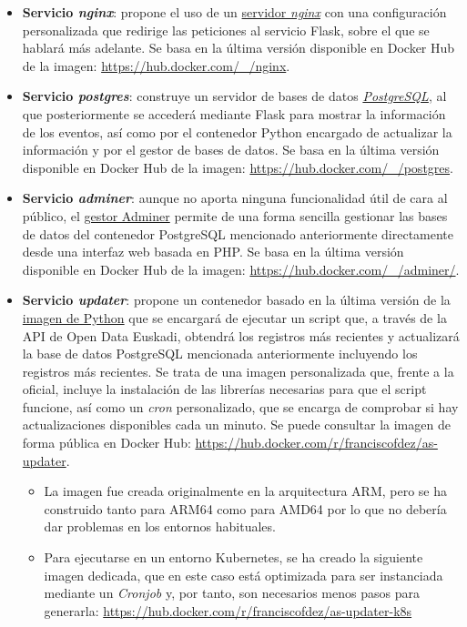 \documentclass{report}
\begin{document}
        \begin{itemize}
            \item \textbf{Servicio \textit{nginx}}: propone el uso de un \href{https://nginx.org/en/}{servidor \textit{nginx}} con una configuración personalizada que redirige las peticiones al servicio Flask, sobre el que se hablará más adelante. Se basa en la última versión disponible en Docker Hub de la imagen: \url{https://hub.docker.com/_/nginx}.
            \item \textbf{Servicio \textit{postgres}}: construye un servidor de bases de datos \textit{\href{https://www.postgresql.org}{PostgreSQL}}, al que posteriormente se accederá mediante Flask para mostrar la información de los eventos, así como por el contenedor Python encargado de actualizar la información y por el gestor de bases de datos. Se basa en la última versión disponible en Docker Hub de la imagen: \url{https://hub.docker.com/_/postgres}.
            \item \textbf{Servicio \textit{adminer}}: aunque no aporta ninguna funcionalidad útil de cara al público, el \href{https://www.adminer.org}{gestor Adminer} permite de una forma sencilla gestionar las bases de datos del contenedor PostgreSQL mencionado anteriormente directamente desde una interfaz web basada en PHP. Se basa en la última versión disponible en Docker Hub de la imagen: \url{https://hub.docker.com/_/adminer/}.
            \item \textbf{Servicio \textit{updater}}: propone un contenedor basado en la última versión de la \href{https://hub.docker.com/_/python}{imagen de Python} que se encargará de ejecutar un script que, a través de la API de Open Data Euskadi, obtendrá los registros más recientes y actualizará la base de datos PostgreSQL mencionada anteriormente incluyendo los registros más recientes. Se trata de una imagen personalizada que, frente a la oficial, incluye la instalación de las librerías necesarias para que el script funcione, así como un \textit{cron} personalizado, que se encarga de comprobar si hay actualizaciones disponibles cada un minuto. Se puede consultar la imagen de forma pública en Docker Hub: \url{https://hub.docker.com/r/franciscofdez/as-updater}.
            \begin{itemize}
                \item La imagen fue creada originalmente en la arquitectura ARM, pero se ha construido tanto para ARM64 como para AMD64 por lo que no debería dar problemas en los entornos habituales.
                \item Para ejecutarse en un entorno Kubernetes, se ha creado la siguiente imagen dedicada, que en este caso está optimizada para ser instanciada mediante un \textit{Cronjob} y, por tanto, son necesarios menos pasos para generarla: \url{https://hub.docker.com/r/franciscofdez/as-updater-k8s}

\end{itemize}
\end{itemize}
\end{document}
